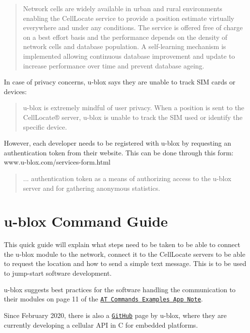 \begin{quote}
Network cells are widely available in urban and rural environments enabling the Cell\+Locate service to provide a position estimate virtually everywhere and under any conditions. The service is offered free of charge on a best effort basis and the performance depends on the density of network cells and database population. A self-\/learning mechanism is implemented allowing continuous database improvement and update to increase performance over time and prevent database ageing. \end{quote}


 

In case of privacy concerns, u-\/blox says they are unable to track S\+IM cards or devices\+: \begin{quote}
u-\/blox is extremely mindful of user privacy. When a position is sent to the Cell\+Locate® server, u-\/blox is unable to track the S\+IM used or identify the specific device. \end{quote}


However, each developer needs to be registered with u-\/blox by requesting an authentication token from their website. This can be done through this form\+: www.\+u-\/blox.\+com/services-\/form.html

\begin{quote}
... authentication token as a means of authorizing access to the u-\/blox server and for gathering anonymous statistics. \end{quote}


\section*{u-\/blox Command Guide}

This quick guide will explain what steps need to be taken to be able to connect the u-\/blox module to the network, connect it to the Cell\+Locate servers to be able to request the location and how to send a simple text message. This is to be used to jump-\/start software development.

u-\/blox suggests best practices for the software handling the communication to their modules on page 11 of the \href{https://www.u-blox.com/sites/default/files/AT-CommandsExamples_AppNote_%28UBX-13001820%29.pdf}{\tt {\ttfamily AT Commands Examples App Note}}.

Since February 2020, there is also a \href{https://github.com/u-blox/cellular}{\tt {\ttfamily Git\+Hub}} page by u-\/blox, where they are currently developing a cellular A\+PI in C for embedded platforms.

